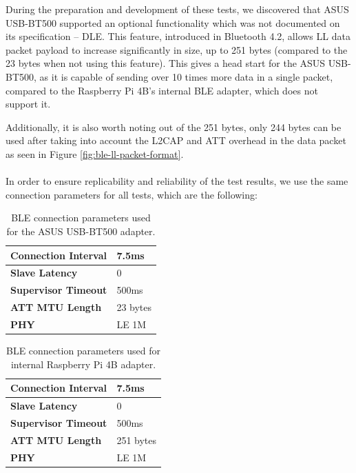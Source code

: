 During the preparation and development of these tests, we discovered that ASUS USB-BT500 supported an optional functionality which was not documented on its specification -- \acf{DLE}. This feature, introduced in Bluetooth 4.2, allows \acs{LL} data packet payload to increase significantly in size, up to 251 bytes (compared to the 23 bytes when not using this feature). This gives a head start for the ASUS USB-BT500, as it is capable of sending over 10 times more data in a single packet, compared to the Raspberry Pi 4B's internal \acs{BLE} adapter, which does not support it. 

Additionally, it is also worth noting out of the 251 bytes, only 244 bytes can be used after taking into account the \acs{L2CAP} and \acs{ATT} overhead in the data packet as seen in Figure \ref{fig:ble-ll-packet-format}.

\paragraph{} In order to ensure replicability and reliability of the test results, we use the same connection parameters for all tests, which are the following:

\begin{table}[H]
    \centering
    \begin{tabular}{|l|l|}
    \hline
    \textbf{Connection Interval} & 7.5ms \\ \hline
    \textbf{Slave Latency}       & 0     \\ \hline
    \textbf{Supervisor Timeout}  & 500ms \\ \hline
    \textbf{\acs{ATT} \acs{MTU} Length}      & 23 bytes   \\ \hline
    \textbf{\acs{PHY}}      & LE 1M   \\ \hline
    
    \end{tabular}
    \caption{\acs{BLE} connection parameters used for the ASUS USB-BT500 adapter.}
    \label{tab:ble-connection-values-hci1}
\end{table}

\begin{table}[H]
    \centering
    \begin{tabular}{|l|l|}
    \hline
    \textbf{Connection Interval} & 7.5ms \\ \hline
    \textbf{Slave Latency}       & 0     \\ \hline
    \textbf{Supervisor Timeout}  & 500ms \\ \hline
    \textbf{\acs{ATT} \acs{MTU} Length}      & 251 bytes   \\ \hline
    \textbf{\acs{PHY}}      & LE 1M   \\ \hline
    \end{tabular}
    \caption{\acs{BLE} connection parameters used for internal Raspberry Pi 4B adapter.}
    \label{tab:ble-connection-values-hci0}
\end{table}


